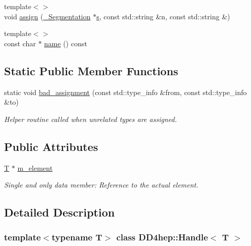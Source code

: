 \begin{DoxyCompactItemize}
{\footnotesize template$<$$>$ }\\void \hyperlink{class_d_d4hep_1_1_handle_a021b31343bc6d67c3c1743f2e1fbc2b7}{assign} (\hyperlink{class_d_d4hep_1_1_d_d_segmentation_1_1_segmentation}{\_\-Segmentation} $\ast$\hyperlink{_volumes_8cpp_a17ca6bfc8040d695d3cada22a4763d40}{s}, const std::string \&n, const std::string \&)
\item 
{\footnotesize template$<$$>$ }\\const char $\ast$ \hyperlink{class_d_d4hep_1_1_handle_ae67b99a35c987f292e426386d6a28552}{name} () const
\end{DoxyCompactItemize}
\subsection*{Static Public Member Functions}
\begin{DoxyCompactItemize}
\item 
static void \hyperlink{class_d_d4hep_1_1_handle_a7d6ad39bc68063a34d8d42ce1d9aef75}{bad\_\-assignment} (const std::type\_\-info \&from, const std::type\_\-info \&to)
\begin{DoxyCompactList}\small\item\em Helper routine called when unrelated types are assigned. \item\end{DoxyCompactList}\end{DoxyCompactItemize}
\subsection*{Public Attributes}
\begin{DoxyCompactItemize}
\item 
\hyperlink{class_t}{T} $\ast$ \hyperlink{class_d_d4hep_1_1_handle_a207411705e86b0f4053357c7a8b5532e}{m\_\-element}
\begin{DoxyCompactList}\small\item\em Single and only data member: Reference to the actual element. \item\end{DoxyCompactList}\end{DoxyCompactItemize}


\subsection{Detailed Description}
\subsubsection*{template$<$typename T$>$ class DD4hep::Handle$<$ T $>$}


